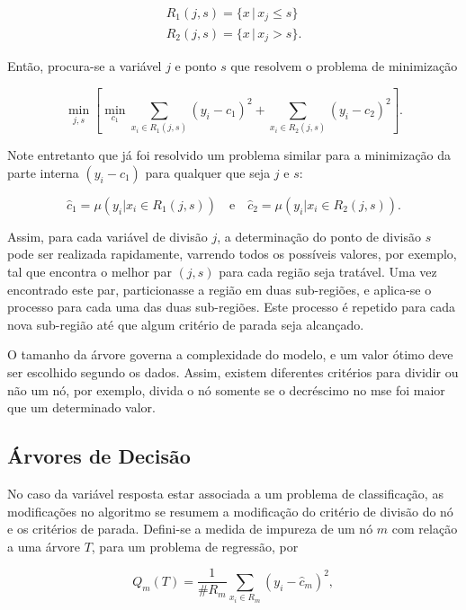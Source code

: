 \begin{align}
R_1(j,s) = \{x\,|\,x_j\le{s}\}\\
R_2(j,s) = \{x\,|\,x_j>s\}\mbox{.}
\end{align}

Então, procura-se a variável $j$ e ponto $s$ que resolvem o problema de minimização

\begin{equation}
\min_{j,s}\left[\min_{c_1}\sum_{x_i\in{R_1(j,s)}}(y_i-c_1)^2+\sum_{x_i\in{R_2(j,s)}}(y_i-c_2)^2\right]\mbox{.}
\end{equation}

Note entretanto que já foi resolvido um problema similar para a minimização da parte interna $(y_i-c_1)$ para qualquer que seja $j$ e $s$:

\begin{equation}
\hat{c}_1=\mu(y_i|x_i\in{R_1(j,s)})\quad\mbox{e}\quad\hat{c}_2=\mu(y_i|x_i\in{R_2(j,s)})\mbox{.}
\end{equation}

Assim, para cada variável de divisão $j$, a determinação do ponto de divisão $s$ pode ser realizada rapidamente, varrendo todos os possíveis valores, por exemplo, tal que encontra o melhor par $(j,s)$ para cada região seja tratável. Uma vez encontrado este par, particionasse a região em duas sub-regiões, e aplica-se o processo para cada uma das duas sub-regiões. Este processo é repetido para cada nova sub-região até que algum critério de parada seja alcançado.

O tamanho da árvore governa a complexidade do modelo, e um valor ótimo deve ser escolhido segundo os dados. Assim, existem diferentes critérios para dividir ou não um nó, por exemplo, divida o nó somente se o decréscimo no mse foi maior que um determinado valor.


\subsection{Árvores de Decisão}

No caso da variável resposta estar associada a um problema de classificação, as modificações no algoritmo se resumem a modificação do critério de divisão do nó e os critérios de parada. Defini-se a medida de impureza de um nó $m$ com relação a uma árvore $T$, para um problema de regressão, por

\begin{equation}
Q_m(T)=\frac{1}{\#R_m}\sum_{x_i\in{R_m}}(y_i-\hat{c}_m)^2\mbox{,}~
\end{equation}

